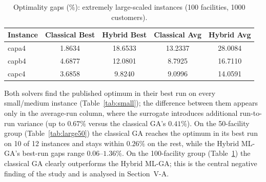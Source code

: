 \documentclass[conference]{IEEEtran}
\begin{document}
\begin{table}[t]
\centering
\caption{Optimality gaps (\%): large-scaled instances (50 facilities).}
\label{tab:large50}
\end{table}

\begin{table}[t]
\centering
\caption{Optimality gaps (\%): extremely large-scaled instances (100 facilities, 1000 customers).}
\label{tab:xlarge}
\begin{tabular}{lcccc}
\toprule
Instance & Classical Best & Hybrid Best & Classical Avg & Hybrid Avg \\
\midrule
capa4 & 1.8634 & 18.6533 & 13.2337 & 28.0084 \\
capb4 & 4.6877 & 12.0801 & 8.7925 & 16.7110 \\
capc4 & 3.6858 & 9.8240 & 9.0996 & 14.0591 \\
\bottomrule
\end{tabular}
\end{table}

Both solvers find the published optimum in their best run on every
small/medium instance (Table~\ref{tab:small}); the difference between them
appears only in the average-run column, where the surrogate introduces
additional run-to-run variance (up to $0.67\%$ versus the classical GA's
$0.41\%$). On the 50-facility group (Table~\ref{tab:large50}) the classical GA
reaches the optimum in its best run on 10 of 12 instances and stays within
$0.26\%$ on the rest, while the Hybrid ML-GA's best-run gaps range
$0.06$--$1.36\%$. On the 100-facility group (Table~\ref{tab:xlarge}) the
classical GA clearly outperforms the Hybrid ML-GA; this is the central
negative finding of the study and is analysed in Section~V-A.
\end{document}
